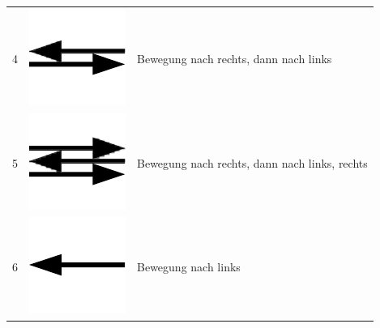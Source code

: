 \documentclass[11pt,a4paper,notitlepage]{article}
\begin{document}
\begin{center}
\begin{supertabular}{rcl}
  4 & \includegraphics[scale=0.25]{img/right-left} & Bewegung nach rechts, dann nach links \\
  5 & \includegraphics[scale=0.25]{img/right-left-right} & Bewegung nach rechts, dann nach links, rechts \\
  6 & \includegraphics[scale=0.25]{img/left} & Bewegung nach links \\
\end{supertabular}
\end{center}
\end{document}

